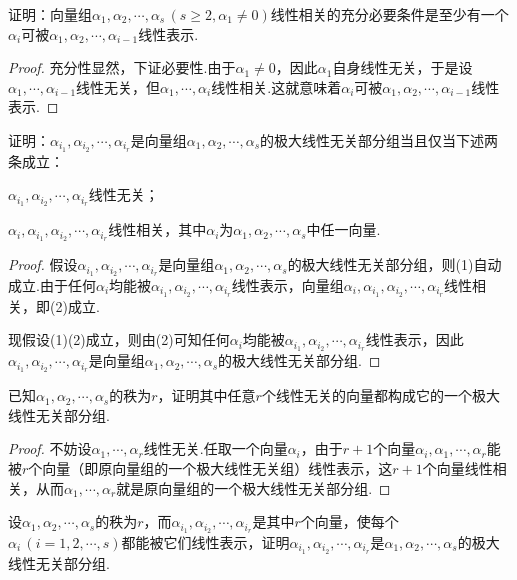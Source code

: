 \begin{prob}[11]
	证明：向量组$\alpha_1,\alpha_2,\cdots,\alpha_s\,(s\ge2,\alpha_1\ne0)$线性相关的充分必要条件是至少有一个$\alpha_i$可被$\alpha_1,\alpha_2,\cdots,\alpha_{i-1}$线性表示.
\end{prob}
\begin{proof}
	充分性显然，下证必要性.由于$\alpha_1\ne0$，因此$\alpha_1$自身线性无关，于是设$\alpha_1,\cdots,\alpha_{i-1}$线性无关，但$\alpha_1,\cdots,\alpha_i$线性相关.这就意味着$\alpha_i$可被$\alpha_1,\alpha_2,\cdots,\alpha_{i-1}$线性表示.
\end{proof}
\begin{prob}[13]
	证明：$\alpha_{i_1},\alpha_{i_2},\cdots,\alpha_{i_r}$是向量组$\alpha_1,\alpha_2,\cdots,\alpha_s$的极大线性无关部分组当且仅当下述两条成立：
	\begin{mylist}
		\item $\alpha_{i_1},\alpha_{i_2},\cdots,\alpha_{i_r}$线性无关；
		\item $\alpha_i,\alpha_{i_1},\alpha_{i_2},\cdots,\alpha_{i_r}$线性相关，其中$\alpha_i$为$\alpha_1,\alpha_2,\cdots,\alpha_s$中任一向量.
	\end{mylist}
\end{prob}
\begin{proof}
	假设$\alpha_{i_1},\alpha_{i_2},\cdots,\alpha_{i_r}$是向量组$\alpha_1,\alpha_2,\cdots,\alpha_s$的极大线性无关部分组，则(1)自动成立.由于任何$\alpha_i$均能被$\alpha_{i_1},\alpha_{i_2},\cdots,\alpha_{i_r}$线性表示，向量组$\alpha_i,\alpha_{i_1},\alpha_{i_2},\cdots,\alpha_{i_r}$线性相关，即(2)成立.

	现假设(1)(2)成立，则由(2)可知任何$\alpha_i$均能被$\alpha_{i_1},\alpha_{i_2},\cdots,\alpha_{i_r}$线性表示，因此$\alpha_{i_1},\alpha_{i_2},\cdots,\alpha_{i_r}$是向量组$\alpha_1,\alpha_2,\cdots,\alpha_s$的极大线性无关部分组.
\end{proof}
\begin{prob}[14]
	已知$\alpha_1,\alpha_2,\cdots,\alpha_s$的秩为$r$，证明其中任意$r$个线性无关的向量都构成它的一个极大线性无关部分组.
\end{prob}
\begin{proof}
	不妨设$\alpha_1,\cdots,\alpha_r$线性无关.任取一个向量$\alpha_i$，由于$r+1$个向量$\alpha_i,\alpha_1,\cdots,\alpha_r$能被$r$个向量（即原向量组的一个极大线性无关组）线性表示，这$r+1$个向量线性相关，从而$\alpha_1,\cdots,\alpha_r$就是原向量组的一个极大线性无关部分组.
\end{proof}
\begin{prob}[15]
	设$\alpha_1,\alpha_2,\cdots,\alpha_s$的秩为$r$，而$\alpha_{i_1},\alpha_{i_2},\cdots,\alpha_{i_r}$是其中$r$个向量，使每个$\alpha_i\,(i=1,2,\cdots,s)$都能被它们线性表示，证明$\alpha_{i_1},\alpha_{i_2},\cdots,\alpha_{i_r}$是$\alpha_1,\alpha_2,\cdots,\alpha_s$的极大线性无关部分组.
\end{prob}
